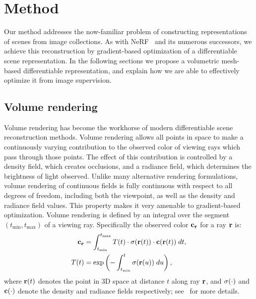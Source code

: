 \section{Method}
\label{sec:method}
% 
Our method addresses the now-familiar problem of constructing representations of scenes from image collections.
As with NeRF~\cite{nerf} and its numerous successors, we achieve this reconstruction by gradient-based optimization of a differentiable scene representation.
In the following sections we propose a volumetric mesh-based differentiable representation, and explain how we are able to effectively optimize it from image supervision.


\subsection{Volume rendering}
% 
Volume rendering has become the workhorse of modern differentiable scene reconstruction methods.
Volume rendering allows all points in space to make a continuously varying contribution to the observed color of viewing rays which pass through those points.
The effect of this contribution is controlled by a density field, which creates occlusions, and a radiance field, which determines the brightness of light observed.
Unlike many alternative rendering formulations, volume rendering of continuous fields is fully continuous with respect to all degrees of freedom, including both the viewpoint, as well as the density and radiance field values.
This property makes it very amenable to gradient-based optimization.
% 
\quad
% 
Volume rendering is defined by an integral over the segment $(t_\textrm{min}, t_\textrm{max})$ of a viewing ray.
Specifically the observed color $\mathbf{c}_{\mathbf{r}}$ for a ray $\mathbf{r}$ is:
%
\begin{align}
\mathbf{c}_{\mathbf{r}} &= \int_{t_\textrm{min}}^{t_\textrm{max}} T(t) \cdot \sigma(\mathbf{r}(t)) \cdot \mathbf{c}(\mathbf{r}(t)) \; dt, \label{eq:volrend}\\
T(t) &= \textrm{exp}\left(-\int_{t_\textrm{min}}^t \sigma(\mathbf{r}(u)) \; du \right),
\end{align}
%
where $\mathbf{r}(t)$ denotes the point in 3D space at distance $t$ along ray $\mathbf{r}$, and $\sigma(\cdot)$ and $\mathbf{c}(\cdot)$ denote the density and radiance fields respectively; see~\cite{digest} for more details.

